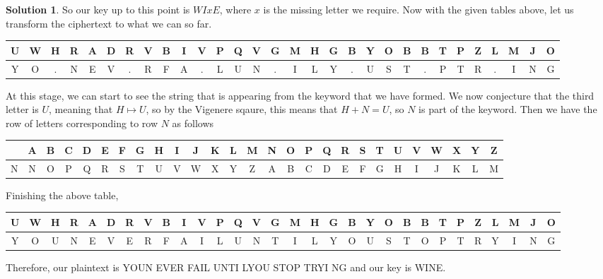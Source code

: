 \documentclass[11pt]{amsart}
\theoremstyle{definition}\newtheorem{question}{Question}
\theoremstyle{definition}\newtheorem*{solution}{Solution}
\begin{document}
\begin{solution}
    So our key up to this point is $WIxE$, where $x$ is the missing letter we require. Now with the given tables above, let us transform the ciphertext to what we can so far.
    \begin{center} \tiny
        \begin{tabular}{cccc|cccc|cccc|cccc|cccc|cccc|cccc|cc}
            U & W & H & R & A & D & R & V & B & I & V & P & Q & V & G & M & H & G & B & Y & O & B & B & T & P & Z & L & M & J & O \\ \hline
            Y & O & . & N & E & V & . & R & F & A & . & L & U & N & . & I & L & Y & . & U & S & T & . & P & T & R & . & I & N & G \\
        \end{tabular}
    \end{center}
    
    At this stage, we can start to see the string that is appearing from the keyword that we have formed. We now conjecture that the third letter is $U$, meaning that $H \mapsto U$, so by the Vigenere sqaure, this means that $H + N = U$, so $N$ is part of the keyword. Then we have the row of letters corresponding to row $N$ as follows
    \begin{center} \footnotesize
        \begin{tabular}{c|cccccccccccccccccccccccccc}
            & A & B & C & D & E & F & G & H & I & J & K & L & M & N & O & P & Q & R & S & T & U & V & W & X & Y & Z \\ \hline
            N & N & O & P & Q & R & S & T & U & V & W & X & Y & Z & A & B & C & D & E & F & G & H & I & J & K & L & M \\
        \end{tabular}
    \end{center}

    Finishing the above table,
    \begin{center} \tiny
        \begin{tabular}{cccc|cccc|cccc|cccc|cccc|cccc|cccc|cc}
            U & W & H & R & A & D & R & V & B & I & V & P & Q & V & G & M & H & G & B & Y & O & B & B & T & P & Z & L & M & J & O \\ \hline
            Y & O & U & N & E & V & E & R & F & A & I & L & U & N & T & I & L & Y & O & U & S & T & O & P & T & R & Y & I & N & G \\
        \end{tabular}
    \end{center}

    Therefore, our plaintext is \textsf{YOUN EVER FAIL UNTI LYOU STOP TRYI NG} and our key is \textsf{WINE}.
\end{solution}
\end{document}
